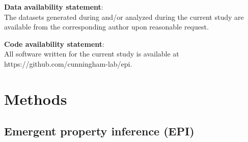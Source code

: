 \documentclass[11pt]{article}
\begin{document}
\textbf{Data availability statement}: \\
The datasets generated during and/or analyzed during the current study are available from the corresponding author upon reasonable request.

\textbf{Code availability statement}: \\
All software written for the current study is available at https://github.com/cunningham-lab/epi.




\newpage 

\section{Methods}

\subsection{Emergent property inference (EPI)}\label{methods_EPI}
%
%
\end{document}
